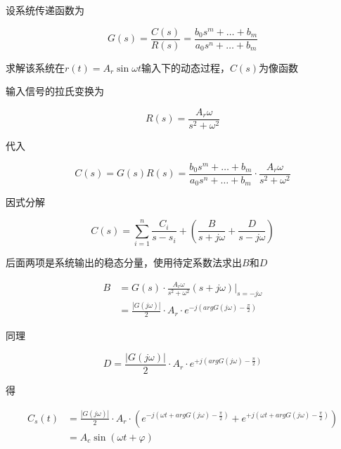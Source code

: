 \documentclass[lang=cn,10pt]{elegantbook}
\begin{document}
\proof

设系统传递函数为

\begin{equation}
	G(s)=\frac{C(s)}{R(s)}=\frac{b_0s^m+\ldots+b_m}{a_0s^n+\ldots+b_m}
\end{equation}

求解该系统在$r(t)=A_r\sin{\omega t}$输入下的动态过程，$C(s)$为像函数

输入信号的拉氏变换为

\begin{equation}
	R(s)=\frac{A_r\omega}{s^2+\omega^2}
\end{equation}

代入

\begin{equation}
	C(s)=G(s)R(s)=\frac{b_0s^m+\ldots+b_m}{a_0s^n+\ldots+b_m}\cdot\frac{A_r\omega}{s^2+\omega^2}
\end{equation}

因式分解

\begin{equation}
	C(s)=\sum_{i=1}^{n}\frac{C_i}{s-s_i}+(\frac{B}{s+j\omega}+\frac{D}{s-j\omega})
\end{equation}

后面两项是系统输出的稳态分量，使用待定系数法求出$B$和$D$

\begin{equation}
	\begin{aligned}
		B & =G(s)\cdot\frac{A_r\omega}{s^2+\omega^2}(s+j\omega)\Big|_{s=-j\omega}     \\
		  & =\frac{|G(j\omega)|}{2}\cdot A_r\cdot e^{-j(argG(j\omega)-\frac{\pi}{2})}
	\end{aligned}
\end{equation}

同理

\begin{equation}
	D=\frac{|G(j\omega)|}{2}\cdot A_r\cdot e^{+j(argG(j\omega)-\frac{\pi}{2})}
\end{equation}

得

\begin{equation}
	\begin{aligned}
		C_s(t) & =\frac{|G(j\omega)|}{2}\cdot A_r\cdot (e^{-j(\omega t+argG(j\omega)-\frac{\pi}{2})}+e^{+j(\omega t+argG(j\omega)-\frac{\pi}{2})})
		\\&=A_c\sin{(\omega t+\varphi)}
	\end{aligned}
\end{equation}
\end{document}
